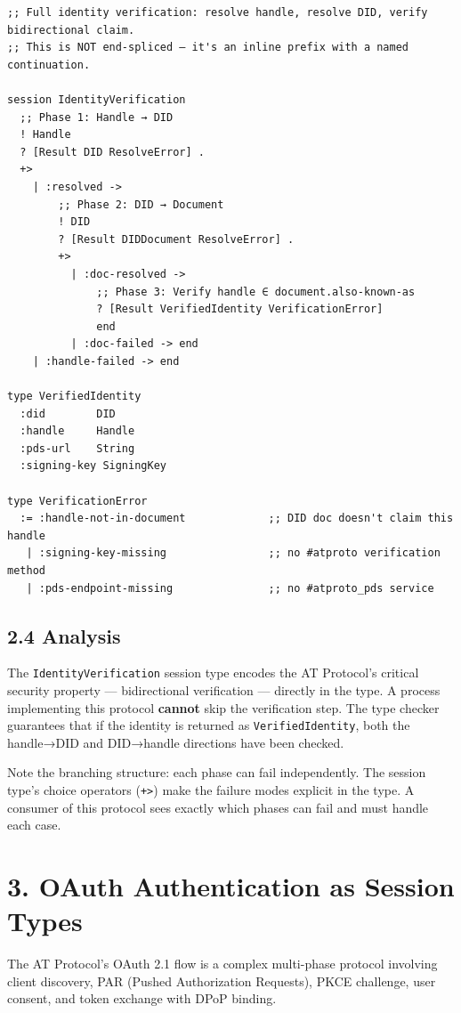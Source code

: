 \documentclass[11pt]{article}
\begin{document}
\begin{verbatim}
;; Full identity verification: resolve handle, resolve DID, verify bidirectional claim.
;; This is NOT end-spliced — it's an inline prefix with a named continuation.

session IdentityVerification
  ;; Phase 1: Handle → DID
  ! Handle
  ? [Result DID ResolveError] .
  +>
    | :resolved ->
        ;; Phase 2: DID → Document
        ! DID
        ? [Result DIDDocument ResolveError] .
        +>
          | :doc-resolved ->
              ;; Phase 3: Verify handle ∈ document.also-known-as
              ? [Result VerifiedIdentity VerificationError]
              end
          | :doc-failed -> end
    | :handle-failed -> end

type VerifiedIdentity
  :did        DID
  :handle     Handle
  :pds-url    String
  :signing-key SigningKey

type VerificationError
  := :handle-not-in-document             ;; DID doc doesn't claim this handle
   | :signing-key-missing                ;; no #atproto verification method
   | :pds-endpoint-missing               ;; no #atproto_pds service
\end{verbatim}
\subsection{2.4 Analysis}
\label{sec:org416be0d}

The \texttt{IdentityVerification} session type encodes the AT Protocol's critical
security property — bidirectional verification — directly in the type. A
process implementing this protocol \textbf{cannot} skip the verification step. The
type checker guarantees that if the identity is returned as \texttt{VerifiedIdentity},
both the handle→DID and DID→handle directions have been checked.

Note the branching structure: each phase can fail independently. The session
type's choice operators (\texttt{+>}) make the failure modes explicit in the type.
A consumer of this protocol sees exactly which phases can fail and must handle
each case.
\section{3. OAuth Authentication as Session Types}
\label{sec:org0f3c7b8}

The AT Protocol's OAuth 2.1 flow is a complex multi-phase protocol involving
client discovery, PAR (Pushed Authorization Requests), PKCE challenge,
user consent, and token exchange with DPoP binding.
\end{document}

